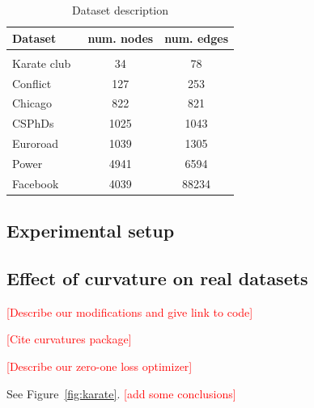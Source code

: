 \documentclass{article} %
\begin{document}
\begin{table}[t]
\caption{Dataset description}
\label{tab:datasets}
\begin{center}
\begin{tabular}{lcc}
Dataset & num. nodes & num. edges \\
 \hline \\
Karate club~\citep{zachary1977information} 
    	& 34 & 78   \\
Conflict~\citep{ward2007disputes} & 127 & 253 \\
Chicago~\citep{eash1979equilibrium} & 822 & 821 \\
CSPhDs~\citep{nooy2006exploratory} & 1025 & 1043 \\
Euroroad~\citep{vsubelj2011robust} &  1039 & 1305 \\
Power~\citep{watts1998collective} & 4941 & 6594 \\
Facebook~\cite{leskovec2012learning} & 4039 & 88234 \\
\end{tabular}
\end{center}
\end{table}

\subsection{Experimental setup}\label{sec:setup}

\subsection{Effect of curvature on real datasets}\label{sec:figures}

\textcolor{red}{[Describe our modifications and give link to code]}

\textcolor{red}{[Cite curvatures package]}

\textcolor{red}{[Describe our zero-one loss optimizer]}

See Figure~\ref{fig:karate}. \textcolor{red}{[add some conclusions]}
\end{document}
